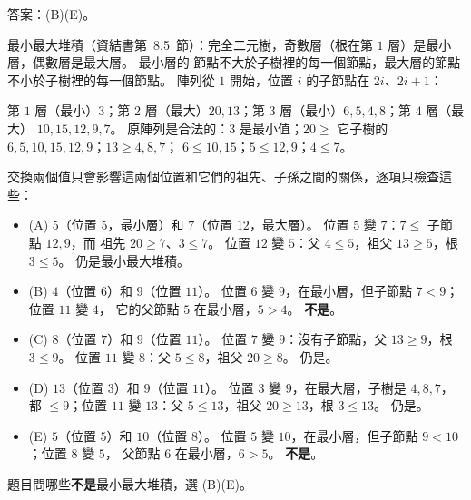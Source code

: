 \begin{pastsoln}
答案：(B)(E)。

最小最大堆積（資結書第~8.5~節）：完全二元樹，奇數層（根在第 $1$ 層）是最小層，偶數層是最大層。 最小層的
節點不大於子樹裡的每一個節點，最大層的節點不小於子樹裡的每一個節點。 陣列從 $1$ 開始，位置 $i$ 的子節點在
$2i$、$2i + 1$：
\begin{center}
\end{center}
第 $1$ 層（最小）$3$；第 $2$ 層（最大）$20, 13$；第 $3$ 層（最小）$6, 5, 4, 8$；第 $4$ 層（最大）
$10, 15, 12, 9, 7$。 原陣列是合法的：$3$ 是最小值；$20 \ge$ 它子樹的 $6, 5, 10, 15, 12, 9$；$13 \ge 4, 8, 7$；
$6 \le 10, 15$；$5 \le 12, 9$；$4 \le 7$。

交換兩個值只會影響這兩個位置和它們的祖先、子孫之間的關係，逐項只檢查這些：
\begin{itemize}
\item (A) $5$（位置 $5$，最小層）和 $7$（位置 $12$，最大層）。 位置 $5$ 變 $7$：$7 \le$ 子節點 $12, 9$，而
祖先 $20 \ge 7$、$3 \le 7$。 位置 $12$ 變 $5$：父 $4 \le 5$，祖父 $13 \ge 5$，根 $3 \le 5$。 仍是最小最大堆積。
\item (B) $4$（位置 $6$）和 $9$（位置 $11$）。 位置 $6$ 變 $9$，在最小層，但子節點 $7 < 9$；位置 $11$ 變 $4$，
它的父節點 $5$ 在最小層，$5 > 4$。 \textbf{不是}。
\item (C) $8$（位置 $7$）和 $9$（位置 $11$）。 位置 $7$ 變 $9$：沒有子節點，父 $13 \ge 9$，根 $3 \le 9$。 位置
$11$ 變 $8$：父 $5 \le 8$，祖父 $20 \ge 8$。 仍是。
\item (D) $13$（位置 $3$）和 $9$（位置 $11$）。 位置 $3$ 變 $9$，在最大層，子樹是 $4, 8, 7$，都 $\le 9$；位置
$11$ 變 $13$：父 $5 \le 13$，祖父 $20 \ge 13$，根 $3 \le 13$。 仍是。
\item (E) $5$（位置 $5$）和 $10$（位置 $8$）。 位置 $5$ 變 $10$，在最小層，但子節點 $9 < 10$；位置 $8$ 變 $5$，
父節點 $6$ 在最小層，$6 > 5$。 \textbf{不是}。
\end{itemize}
題目問哪些\textbf{不是}最小最大堆積，選 (B)(E)。
\end{pastsoln}
